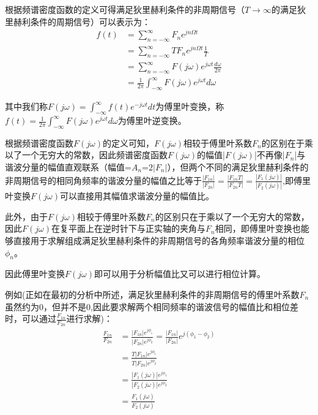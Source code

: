 \documentclass{article}
\numberwithin{equation}{section}
\numberwithin{figure}{section}
\begin{document}
根据频谱密度函数的定义可得满足狄里赫利条件的非周期信号（$T\rightarrow \infty$的满足狄里赫利条件的周期信号）可以表示为：
\begin{equation}
    \begin{split}
        f(t)&=\sum_{n=-\infty}^{\infty}F_ne^{jn\Omega t}\\
        &=\sum_{n=-\infty}^{\infty}TF_ne^{jn\Omega t}\frac{1}{T}\\
        &=\sum_{n=-\infty}^{\infty}F(j\omega)e^{j\omega t}\frac{d\omega}{2\pi}\\
        &=\frac{1}{2\pi}\int_{-\infty}^{\infty}F(j\omega)e^{j\omega t}d\omega
    \end{split}
\end{equation}

其中我们称$F(j\omega)=\int_{-\infty}^{\infty}f(t)e^{-j\omega t}dt$为傅里叶变换，称$f(t)=\frac{1}{2\pi}\int_{-\infty}^{\infty}F(j\omega)e^{j\omega t}d\omega$为傅里叶逆变换。

根据频谱密度函数$F(j\omega)$的定义可知，$F(j\omega)$相较于傅里叶系数$F_n$的区别在于乘以了一个无穷大的常数，因此频谱密度函数$F(j\omega)$的幅值|$F(j\omega)$|不再像|$F_n$|与谐波分量的幅值直观联系（幅值=$A_n$=$2|F_n|$），但两个不同的满足狄里赫利条件的非周期信号的相同角频率的谐波分量的幅值之比等于$\frac{|F_{1n}|}{|F_{2n}|}=\frac{|F_{1n}T|}{|F_{2n}T|}=\frac{|F_1(j\omega)|}{|F_2(j\omega)|}$,即傅里叶变换$F(j\omega)$可以直接用其幅值求谐波分量的幅值比。

此外，由于$F(j\omega)$相较于傅里叶系数$F_n$的区别只在于乘以了一个无穷大的常数，因此$F(j\omega)$在复平面上在逆时针下与正实轴的夹角与$F_n$相同，即傅里叶变换也能够直接用于求解组成满足狄里赫利条件的非周期信号的各角频率谐波分量的相位$\phi_n$。

因此傅里叶变换$F(j\omega)$即可以用于分析幅值比又可以进行相位计算。

例如(正如在最初的分析中所述，满足狄里赫利条件的非周期信号的傅里叶系数$F_n$虽然约为0，但并不是0,因此要求解两个相同频率的谐波信号的幅值比和相位差时，可以通过$\frac{F_{1n}}{F_{2n}}$进行求解)：
\begin{equation}
    \begin{split}
        \frac{F_{1n}}{F_{2n}}&=\frac{|F_{1n}|e^{j\phi_1}}{|F_{2n}|e^{j\phi_2}}=\frac{|F_{1n}|}{|F_{2n}|}e^{j(\phi_1-\phi_2)}\\
        &=\frac{T|F_{1n}|e^{j\phi_1}}{T|F_{2n}|e^{j\phi_2}}\\
        &=\frac{|F_1(j\omega)|e^{j\phi_1}}{|F_2(j\omega)|e^{j\phi_2}}\\
        &=\frac{F_1{(j\omega)}}{F_2{(j\omega)}}\label{fuzhi&xiangwei}
    \end{split}
\end{equation}
\end{document}
